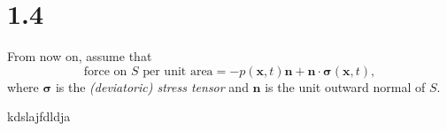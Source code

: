 \section{1.4}
\label{sec:1.4}

\begin{asm}
  \label{asm:surfaceForceViscous}
  From now on,
  assume that
  \begin{equation}
    \label{eq:surfaceForceSigma}
    \text{force on $S$ per unit area} = -p(\mathbf{x},t)\mathbf{n}+\mathbf{n}\cdot\boldsymbol\sigma(\mathbf{x},t),
  \end{equation}
  where $\boldsymbol\sigma$ is the \emph{(deviatoric) stress tensor} and
  $\mathbf{n}$ is the unit outward normal of $S$.
\end{asm}

kdslajfdldja
